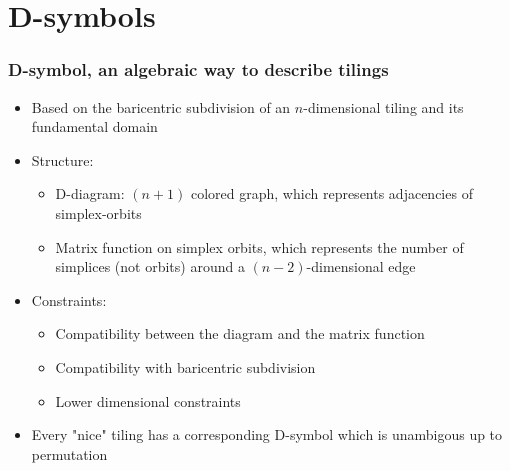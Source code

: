 \section{D-symbols}
\begin{frame}
  \frametitle{D-symbol, an algebraic way to describe tilings}
  \begin{itemize}
    \item Based on the baricentric subdivision of an $n$-dimensional tiling and its fundamental
      domain 
    \item Structure:
      \begin{itemize}
        \item D-diagram: $(n+1)$ colored graph, which represents adjacencies of
          simplex-orbits
        \item Matrix function on simplex orbits, which represents the number of
          simplices (not orbits) around a $(n-2)$-dimensional edge
      \end{itemize}
    \item Constraints:
      \begin{itemize}
        \item Compatibility between the diagram and the matrix function
        \item Compatibility with baricentric subdivision
        \item Lower dimensional constraints
      \end{itemize}
    \item Every "nice" tiling has a corresponding D-symbol which is unambigous
      up to permutation 
  \end{itemize}
\end{frame}

